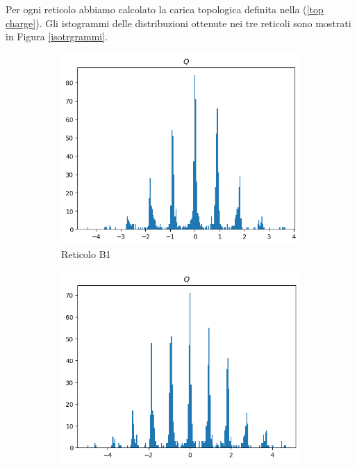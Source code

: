 \documentclass{article}
\numberwithin{equation}{subsection}
\begin{document}
Per ogni reticolo abbiamo calcolato la carica topologica definita nella (\ref{top charge}). Gli istogrammi delle distribuzioni ottenute nei tre reticoli sono mostrati in Figura \ref{isotrgrammi}.
\begin{figure}[H]
  \centering
  \begin{subfigure}{0.41\linewidth}
    \centering
    \includegraphics[width=\linewidth]{images/istoB1.png}
    \caption{Reticolo B1}
  \end{subfigure}
  \hfill
  \begin{subfigure}{0.41\linewidth}
    \centering
    \includegraphics[width=\linewidth]{images/istoB2.png}

\end{subfigure}
\end{figure}
\end{document}
